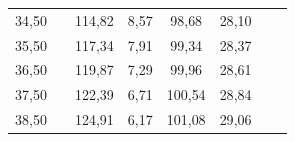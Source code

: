 \documentclass{article}
\begin{document}
\begin{table}[h]
\begin{center}
\begin{tabular}{cXcccccr}
         34{,}50   &&     114{,}82     &     8{,}57&         98{,}68     &    28{,}10 \\
         35{,}50    &&    117{,}34     &     7{,}91&         99{,}34   &      28{,}37 \\
         36{,}50    &&    119{,}87     &     7{,}29&         99{,}96    &     28{,}61 \\
         37{,}50    &&    122{,}39      &    6{,}71&        100{,}54  &       28{,}84 \\
         38{,}50    &&    124{,}91     &     6{,}17&        101{,}08&         29{,}06 \\
	\bottomrule[1pt]
	\end{tabular}
\end{center}
	\begin{minipage}{\linewidth}
	\end{minipage}
\end{table}	


\end{document}
